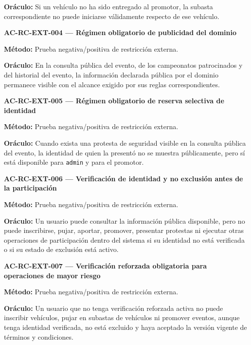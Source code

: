 \documentclass[10pt,letterpaper]{article}
\begin{document}
\textbf{Oráculo:} Si un vehículo no ha sido entregado al promotor, la subasta correspondiente no puede iniciarse válidamente respecto de ese vehículo.\par\vspace{0.45em}
\noindent\textbf{AC-RC-EXT-004 --- Régimen obligatorio de publicidad del dominio}\par
\textbf{Método:} Prueba negativa/positiva de restricción externa.\par
\textbf{Oráculo:} En la consulta pública del evento, de los campeonatos patrocinados y del historial del evento, la información declarada pública por el dominio permanece visible con el alcance exigido por sus reglas correspondientes.\par\vspace{0.45em}
\noindent\textbf{AC-RC-EXT-005 --- Régimen obligatorio de reserva selectiva de identidad}\par
\textbf{Método:} Prueba negativa/positiva de restricción externa.\par
\textbf{Oráculo:} Cuando exista una protesta de seguridad visible en la consulta pública del evento, la identidad de quien la presentó no se muestra públicamente, pero sí está disponible para \texttt{admin} y para el promotor.\par\vspace{0.45em}
\noindent\textbf{AC-RC-EXT-006 --- Verificación de identidad y no exclusión antes de la participación}\par
\textbf{Método:} Prueba negativa/positiva de restricción externa.\par
\textbf{Oráculo:} Un usuario puede consultar la información pública disponible, pero no puede inscribirse, pujar, aportar, promover, presentar protestas ni ejecutar otras operaciones de participación dentro del sistema si su identidad no está verificada o si su estado de exclusión está activo.\par\vspace{0.45em}
\noindent\textbf{AC-RC-EXT-007 --- Verificación reforzada obligatoria para operaciones de mayor riesgo}\par
\textbf{Método:} Prueba negativa/positiva de restricción externa.\par
\textbf{Oráculo:} Un usuario que no tenga verificación reforzada activa no puede inscribir vehículos, pujar en subastas de vehículos ni promover eventos, aunque tenga identidad verificada, no está excluido y haya aceptado la versión vigente de términos y condiciones.\par\vspace{0.45em}
\end{document}
